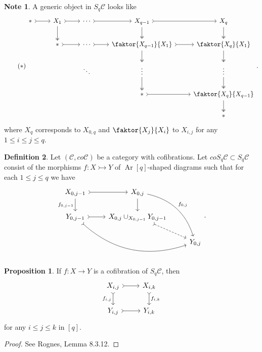 \documentclass[10pt,letterpaper,cm]{nupset}
\theoremstyle{definition}
\newtheorem{definition}{Definition}
\newtheorem{note}[definition]{Note}
\theoremstyle{theorem}
\newtheorem{prop}[theorem]{Proposition}
\theoremstyle{remark}
\newcommand{\1}{\mathbf{1}}
\renewcommand{\c}{\mathscr{C}}
\newcommand{\0}{\vec 0}
\DeclareMathOperator{\Ar}{Ar}
\begin{document}
\begin{note}\label{note}
A generic object in $S_q\c$ looks like
\[ \tag{$\ast$}
\begin{tikzcd}
\ast \arrow[r, tail] & X_1 \arrow[r, tail] \arrow[d, two heads] & \cdots \arrow[r, tail] & X_{q-1} \arrow[r, tail] \arrow[d, two heads] & X_q \arrow[d, two heads] \\
 & \ast \arrow[r, tail] & \cdots \arrow[r, tail] & \faktor{X_{q-1}}{X_1} \arrow[d, two heads] \arrow[r, tail] & \faktor{X_q}{X_1} \arrow[d, two heads] \\
 &  & \ddots & \vdots \arrow[d, two heads] & \vdots \arrow[d, two heads] \\
 &  &  & \ast \arrow[r, tail] & \faktor{X_q}{X_{q-1}} \arrow[d, two heads] \\
 &  &  &  & \ast
\end{tikzcd}.
\] where $X_q$ corresponds to $X_{0, q}$ and $\faktor{X_j}{X_i}$ to $X_{i, j}$ for any $1 \leq i \leq j \leq q$. 
\end{note}

\begin{definition}
Let $(\c, co\c)$ be a category with cofibrations. Let $coS_q\c \subset S_q \c$ consist of the morphisms $f: X \rightarrowtail Y$ of $\Ar[q]$-shaped diagrams such that for each $1\leq j \leq q$ we have
\[
\begin{tikzcd}
{X_{0, j-1}} \arrow[d, "{f_{0, j-1}}"'] \arrow[r, tail] & {X_{0, j}} \arrow[d] \arrow[rdd, "{f_{0, j}}", bend left] &  \\
{Y_{0, j-1}} \arrow[r, tail] \arrow[rrd, tail, bend right] & {X_{0, j} \cup_{X_{0, j-1}} Y_{0, j-1}} \arrow[rd, dashed, tail] &  \\
 &  & {Y_{0, j}}
\end{tikzcd}.
\]
\end{definition}

\begin{prop}
If $f: X \to Y$ is a cofibration of $S_q\c$, then 
\[
\begin{tikzcd}
{X_{i, j}} \arrow[d, "{f_{i,j}}"', tail] \arrow[r, tail] & {X_{i, k}} \arrow[d, "{f_{i,k}}", tail] \\
{Y_{i, j}} \arrow[r, tail] & {Y_{i,k}}
\end{tikzcd}
\] for any $i \leq j \leq k$ in $[q]$.
\end{prop}
\begin{proof}
See Rognes, Lemma 8.3.12.
\end{proof}
\end{document}
